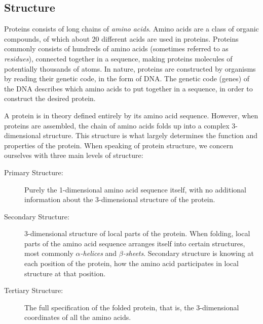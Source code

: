 

\subsection{Structure}
\label{sec:protein_structure}
Proteins consists of long chains of \textit{amino acids}. Amino acids are a class of organic compounds, of which about 20 different acids are used in proteins. Proteins commonly consists of hundreds of amino acids (sometimes referred to as \textit{residues}), connected together in a sequence, making proteins molecules of potentially thousands of atoms. In nature, proteins are constructed by organisms by reading their genetic code, in the form of DNA. The genetic code (genes) of the DNA describes which amino acids to put together in a sequence, in order to construct the desired protein. 

A protein is in theory defined entirely by its amino acid sequence. However, when proteins are assembled, the chain of amino acids folds up into a complex 3-dimensional structure. This structure is what largely determines the function and properties of the protein. When speaking of protein structure, we concern ourselves with three main levels of structure:

\begin{description}
    \item[Primary Structure:] Purely the 1-dimensional amino acid sequence itself, with no additional information about the 3-dimensional structure of the protein.
    \item[Secondary Structure:] 3-dimensional structure of local parts of the protein. When folding, local parts of the amino acid sequence arranges itself into certain structures, most commonly \textit{$\alpha$-helices} and \textit{$\beta$-sheets}. Secondary structure is knowing at each position of the protein, how the amino acid participates in local structure at that position.
    \item[Tertiary Structure:] The full specification of the folded protein, that is, the 3-dimensional coordinates of all the amino acids.
\end{description}

